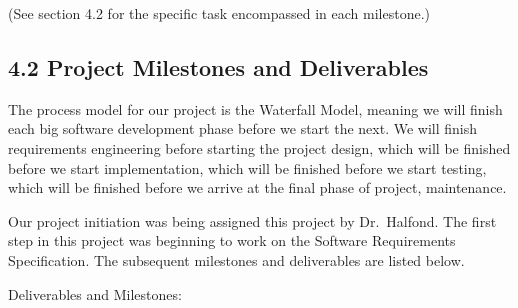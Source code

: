 \documentclass[]{article}
\begin{document}
(See section 4.2 for the specific task encompassed in each milestone.)

\subsection{4.2 Project Milestones and
Deliverables}\label{project-milestones-and-deliverables}

The process model for our project is the Waterfall Model, meaning we
will finish each big software development phase before we start the
next. We will finish requirements engineering before starting the
project design, which will be finished before we start implementation,
which will be finished before we start testing, which will be finished
before we arrive at the final phase of project, maintenance.

Our project initiation was being assigned this project by Dr.~Halfond.
The first step in this project was beginning to work on the Software
Requirements Specification. The subsequent milestones and deliverables
are listed below.

Deliverables and Milestones:
\end{document}
